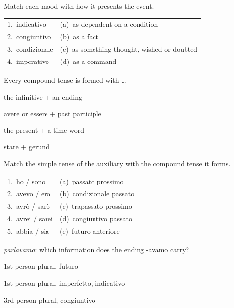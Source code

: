 \documentclass[11pt,a4paper,twoside,openright]{book}
\begin{document}
\begin{exercises}
\item\label{ex:verb-system-overview-1}\relax Match each mood with how it presents the event.\par\smallskip\begin{tabularx}{\linewidth}{@{}L L@{}}
1.\ indicativo & (a)\ as dependent on a condition \\
2.\ congiuntivo & (b)\ as a fact \\
3.\ condizionale & (c)\ as something thought, wished or doubted \\
4.\ imperativo & (d)\ as a command \\
\end{tabularx}
\item\label{ex:verb-system-overview-2}\relax Every compound tense is formed with …\par\nopagebreak\begin{options}
\item\relax the infinitive + an ending
\item\relax avere or essere + past participle
\item\relax the present + a time word
\item\relax stare + gerund
\end{options}
\item\label{ex:verb-system-overview-3}\relax Match the simple tense of the auxiliary with the compound tense it forms.\par\smallskip\begin{tabularx}{\linewidth}{@{}L L@{}}
1.\ ho / sono & (a)\ passato prossimo \\
2.\ avevo / ero & (b)\ condizionale passato \\
3.\ avrò / sarò & (c)\ trapassato prossimo \\
4.\ avrei / sarei & (d)\ congiuntivo passato \\
5.\ abbia / sia & (e)\ futuro anteriore \\
\end{tabularx}
\item\label{ex:verb-system-overview-4}\relax \textit{parlavamo}: which information does the ending -avamo carry?\par\nopagebreak\begin{options}
\item\relax 1st person plural, futuro
\item\relax 1st person plural, imperfetto, indicativo
\item\relax 3rd person plural, congiuntivo

\end{options}
\end{exercises}
\end{document}
